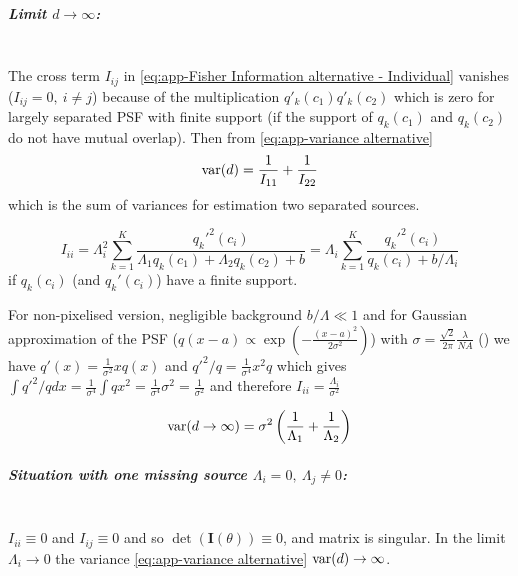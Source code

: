 \subparagraph*{Limit $d\rightarrow\infty$:}\ \\
The cross term $I_{ij}$ in \autoref{eq:app-Fisher Information alternative - Individual} vanishes ($I_{ij}=0,\: i\neq j$) because of the multiplication $q'_k(c_1)q'_k(c_2)$ which is zero for largely separated PSF with finite support (if the support of $q_k(c_1)$ and $q_k(c_2)$ do not have mutual overlap). Then from \autoref{eq:app-variance alternative} 
%
\begin{equation}
	\mathrm{var}(d)=\frac{1}{I_{11}}+\frac{1}{I_{22}}
\end{equation}
%
which is the sum of variances for estimation two separated sources.

\begin{equation}
	I_{ii}=\Lambda_i^2\sum_{k=1}^K\frac{q_k'^2(c_i)}{\Lambda_1q_k(c_1)+\Lambda_2q_k(c_2)+b}=\Lambda_i\sum_{k=1}^K\frac{q_k'^2(c_i)}{q_k(c_i)+b/\Lambda_i}
\end{equation}
%
if $q_k(c_i)$ (and $q_k'(c_i)$) have a finite support.

For non-pixelised version, negligible background $b/\Lambda\ll1$ and for Gaussian approximation of the PSF ($q(x-a)\propto\exp\left(-\frac{(x-a)^2}{2\sigma^2}\right)$) with
$\sigma=\frac{\sqrt{2}}{2\pi}\frac{\lambda}{NA}$ (\cite{Zhang2007}) we have $q'(x)=\frac{1}{\sigma^2}xq(x)$ and $q'^2/q=\frac{1}{\sigma^4}x^2q$ which gives $\int q'^2/qdx=\frac{1}{\sigma^4}\int qx^2=\frac{1}{\sigma^4}\sigma^2=\frac{1}{\sigma^2}$ and therefore $I_{ii}=\frac{\Lambda_i}{\sigma^2}$ 

\begin{equation*}
	\mathrm{var}(d\rightarrow\infty) =\sigma^2\left(\frac{1}{\Lambda_1}+\frac{1}{\Lambda_2}\right)
\end{equation*}

\subparagraph*{Situation with one missing source $\Lambda_i=0,\ \Lambda_j\neq0$:}\ \\
$I_{ii}\equiv0$ and $I_{ij}\equiv0$ and so $\det(\bm{I}(\theta))\equiv0$, and matrix is singular. In the limit $\Lambda_i\rightarrow0$ the
variance \autoref{eq:app-variance alternative} $\mathrm{var}(d)\rightarrow\infty$. 


